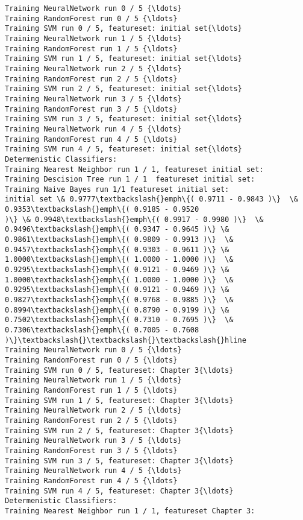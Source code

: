\documentclass[11pt]{article}
\begin{document}
    \begin{Verbatim}[commandchars=\\\{\}]
Training NeuralNetwork run 0 / 5 {\ldots}
Training RandomForest run 0 / 5 {\ldots}
Training SVM run 0 / 5, featureset: initial set{\ldots}
Training NeuralNetwork run 1 / 5 {\ldots}
Training RandomForest run 1 / 5 {\ldots}
Training SVM run 1 / 5, featureset: initial set{\ldots}
Training NeuralNetwork run 2 / 5 {\ldots}
Training RandomForest run 2 / 5 {\ldots}
Training SVM run 2 / 5, featureset: initial set{\ldots}
Training NeuralNetwork run 3 / 5 {\ldots}
Training RandomForest run 3 / 5 {\ldots}
Training SVM run 3 / 5, featureset: initial set{\ldots}
Training NeuralNetwork run 4 / 5 {\ldots}
Training RandomForest run 4 / 5 {\ldots}
Training SVM run 4 / 5, featureset: initial set{\ldots}
Determenistic Classifiers:
Training Nearest Neighbor run 1 / 1, featureset initial set:
Training Descision Tree run 1 / 1  featureset initial set:
Training Naive Bayes run 1/1 featureset initial set:
initial set \& 0.9777\textbackslash{}emph\{( 0.9711 - 0.9843 )\}  \& 0.9353\textbackslash{}emph\{( 0.9185 - 0.9520
)\} \& 0.9948\textbackslash{}emph\{( 0.9917 - 0.9980 )\}  \& 0.9496\textbackslash{}emph\{( 0.9347 - 0.9645 )\} \&
0.9861\textbackslash{}emph\{( 0.9809 - 0.9913 )\}  \& 0.9457\textbackslash{}emph\{( 0.9303 - 0.9611 )\} \&
1.0000\textbackslash{}emph\{( 1.0000 - 1.0000 )\}  \& 0.9295\textbackslash{}emph\{( 0.9121 - 0.9469 )\} \&
1.0000\textbackslash{}emph\{( 1.0000 - 1.0000 )\}  \& 0.9295\textbackslash{}emph\{( 0.9121 - 0.9469 )\} \&
0.9827\textbackslash{}emph\{( 0.9768 - 0.9885 )\}  \& 0.8994\textbackslash{}emph\{( 0.8790 - 0.9199 )\} \&
0.7502\textbackslash{}emph\{( 0.7310 - 0.7695 )\}  \& 0.7306\textbackslash{}emph\{( 0.7005 - 0.7608 )\}\textbackslash{}\textbackslash{}\textbackslash{}hline
Training NeuralNetwork run 0 / 5 {\ldots}
Training RandomForest run 0 / 5 {\ldots}
Training SVM run 0 / 5, featureset: Chapter 3{\ldots}
Training NeuralNetwork run 1 / 5 {\ldots}
Training RandomForest run 1 / 5 {\ldots}
Training SVM run 1 / 5, featureset: Chapter 3{\ldots}
Training NeuralNetwork run 2 / 5 {\ldots}
Training RandomForest run 2 / 5 {\ldots}
Training SVM run 2 / 5, featureset: Chapter 3{\ldots}
Training NeuralNetwork run 3 / 5 {\ldots}
Training RandomForest run 3 / 5 {\ldots}
Training SVM run 3 / 5, featureset: Chapter 3{\ldots}
Training NeuralNetwork run 4 / 5 {\ldots}
Training RandomForest run 4 / 5 {\ldots}
Training SVM run 4 / 5, featureset: Chapter 3{\ldots}
Determenistic Classifiers:
Training Nearest Neighbor run 1 / 1, featureset Chapter 3:

\end{Verbatim}
\end{document}
